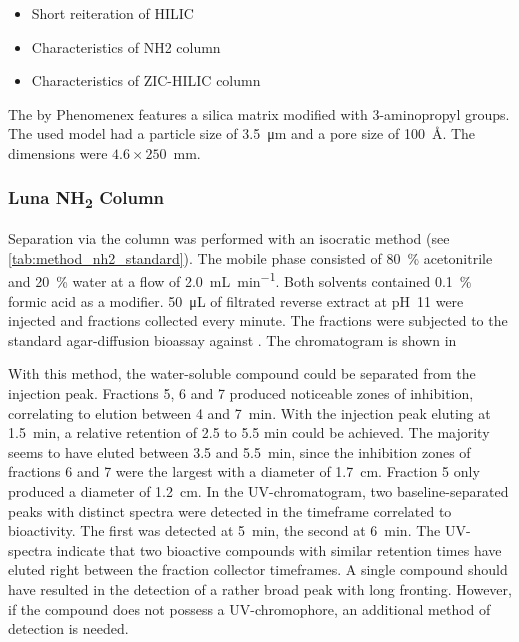 \begin{itemize}
	\item Short reiteration of HILIC
	\item Characteristics of NH2 column
	\item Characteristics of ZIC-HILIC column
\end{itemize}

The \luna by Phenomenex features a silica matrix modified with 3-aminopropyl groups.
The used model had a particle size of \SI{3.5}{\micro\meter} and a pore size of 100~\AA.
The dimensions were $4.6\times250$~mm.

\subsubsection{Luna NH\textsubscript{2} Column}

Separation via the \luna column was performed with an isocratic method (see \ref{tab:method_nh2_standard}).
The mobile phase consisted of 80~\% acetonitrile and 20~\% water at a flow of \SI{2.0}{\milli\liter\per\minute}.
Both solvents contained 0.1~\% formic acid as a modifier.
\SI{50}{\micro\liter} of filtrated reverse extract at pH~11 were injected and fractions collected every minute.
The fractions were subjected to the standard agar-diffusion bioassay against \coli.
The chromatogram is shown in


With this method, the water-soluble compound could be separated from the injection peak.
Fractions 5, 6 and 7 produced noticeable zones of inhibition, correlating to elution between 4 and 7~min.
With the injection peak eluting at 1.5~min, a relative retention of 2.5 to 5.5 min could be achieved.
The majority seems to have eluted between 3.5 and 5.5~min, since the inhibition zones of fractions 6 and 7 were the largest with a diameter of \SI{1.7}{\centi\meter}.
Fraction 5 only produced a diameter of \SI{1.2}{\centi\meter}.
In the UV-chromatogram, two baseline-separated peaks with distinct spectra were detected in the timeframe correlated to bioactivity.
The first was detected at 5~min, the second at 6~min. The UV-spectra  indicate that two bioactive compounds with similar retention times have eluted right between the fraction collector timeframes.
A single compound should have resulted in the detection of a rather broad peak with long fronting.
However, if the compound does not possess a UV-chromophore, an additional method of detection is needed.

